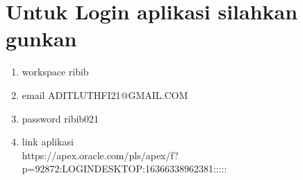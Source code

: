 \documentclass[12pt, times new roman, a4paper]{article}
\begin{document}
\section*{Untuk Login aplikasi silahkan gunkan}
\begin{enumerate}
\item workspace ribib
\item email ADITLUTHFI21@GMAIL.COM
\item password ribib021
\item link aplikasi\\ 
https://apex.oracle.com/pls/apex/f?p=92872:LOGIN\textunderscore DESKTOP:16366338962381:::::
\end{enumerate}
\end{document}
